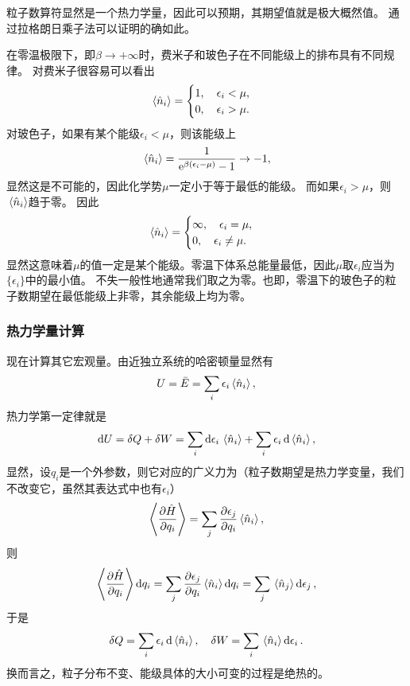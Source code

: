 \documentclass[hyperref, UTF8, a4paper]{ctexart}
\newcommand*{\ee}{\mathrm{e}}
\begin{document}
粒子数算符显然是一个热力学量，因此可以预期，其期望值就是极大概然值。
通过拉格朗日乘子法可以证明的确如此。

在零温极限下，即$\beta \to + \infty$时，费米子和玻色子在不同能级上的排布具有不同规律。
对费米子很容易可以看出
\begin{equation}
    \expval*{\hat{n}_i} = \begin{cases}
        1, \quad \epsilon_i < \mu, \\
        0, \quad \epsilon_i > \mu.
    \end{cases}
\end{equation}
对玻色子，如果有某个能级$\epsilon_i < \mu$，则该能级上
\[
    \expval*{\hat{n}_i} = \frac{1}{\ee^{  \beta (\epsilon_i - \mu)} - 1} \to -1,
\]
显然这是不可能的，因此化学势$\mu$一定小于等于最低的能级。
而如果$\epsilon_i > \mu$，则$\expval*{\hat{n}_i}$趋于零。
因此
\[
    \expval*{\hat{n}_i} = \begin{cases}
        \infty, \quad \epsilon_i = \mu, \\
        0, \quad \epsilon_i \neq \mu.
    \end{cases}
\]
显然这意味着$\mu$的值一定是某个能级。零温下体系总能量最低，因此$\mu$取$\epsilon_i$应当为$\{\epsilon_i\}$中的最小值。
不失一般性地通常我们取之为零。也即，零温下的玻色子的粒子数期望在最低能级上非零，其余能级上均为零。

\subsubsection{热力学量计算}

现在计算其它宏观量。由近独立系统的哈密顿量显然有
\begin{equation}
    U = \bar{E} = \sum_i \epsilon_i \expval*{\hat{n}_i},
\end{equation}
热力学第一定律就是
\[
    \dd{U} = \var{Q} + \var{W} = \sum_i \dd{\epsilon_i} \expval*{\hat{n}_i} + \sum_i \epsilon_i \dd{\expval*{\hat{n}_i}},
\]
显然，设$q_i$是一个外参数，则它对应的广义力为（粒子数期望是热力学变量，我们不改变它，虽然其表达式中也有$\epsilon_i$）
\[
    \expval{\pdv{\hat{H}}{q_i}} = \sum_j \pdv{\epsilon_j}{q_i} \expval*{\hat{n}_i},
\]
则
\[
    \expval{\pdv{\hat{H}}{q_i}} \dd{q_i} = \sum_j \pdv{\epsilon_j}{q_i} \expval*{\hat{n}_i} \dd{q_i} = \sum_j \expval*{\hat{n}_j} \dd{\epsilon_j},
\]
于是
\begin{equation}
    \var{Q} = \sum_i \epsilon_i \dd{\expval*{\hat{n}_i}}, \quad \var{W} = \sum_i \expval*{\hat{n}_i} \dd{\epsilon_i}.
    \label{eq:independent-q-and-w}
\end{equation}
换而言之，粒子分布不变、能级具体的大小可变的过程是绝热的。
\end{document}
